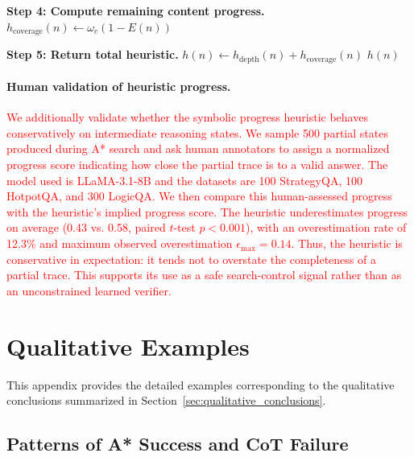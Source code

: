 \documentclass[11pt]{article}
\begin{document}
{\begin{algorithm}[t]
\BlankLine
\textbf{Step 4: Compute remaining content progress.}\;
\(h_{\mathrm{coverage}}(n) \leftarrow \omega_c(1-E(n))\)\;

\BlankLine
\textbf{Step 5: Return total heuristic.}\;
\(h(n) \leftarrow h_{\mathrm{depth}}(n)+h_{\mathrm{coverage}}(n)\)\;
\Return \(h(n)\)\;
\end{algorithm}

\paragraph{Human validation of heuristic progress.}
\textcolor{red}{We additionally validate whether the symbolic progress heuristic behaves}
\textcolor{red}{conservatively on intermediate reasoning states. We sample 500 partial}
\textcolor{red}{states produced during A* search and ask human annotators to assign a}
\textcolor{red}{normalized progress score indicating how close the partial trace is to a}
\textcolor{red}{valid answer. The model used is LLaMA-3.1-8B and the datasets are 100 StrategyQA, 100 HotpotQA, and 300 LogicQA. We then compare this human-assessed progress with the}
\textcolor{red}{heuristic's implied progress score. The heuristic underestimates progress}
\textcolor{red}{on average (0.43 vs. 0.58, paired \(t\)-test \(p<0.001\)), with an}
\textcolor{red}{overestimation rate of 12.3\% and maximum observed overestimation}
\textcolor{red}{\(\epsilon_{\max}=0.14\). Thus, the heuristic is conservative in}
\textcolor{red}{expectation: it tends not to overstate the completeness of a partial}
\textcolor{red}{trace. This supports its use as a safe search-control signal rather than}
\textcolor{red}{as an unconstrained learned verifier.}


















\section{Qualitative Examples}
\label{app:qualitative_examples}

This appendix provides the detailed examples corresponding to the qualitative conclusions summarized in Section~\ref{sec:qualitative_conclusions}.

\subsection{Patterns of A* Success and CoT Failure}
\label{app:astar_success}

}
\end{document}
